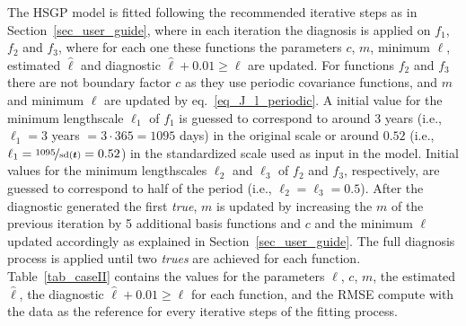 The HSGP model is fitted following the recommended iterative steps as in Section~\ref{sec_user_guide}, where in each iteration the diagnosis is applied on $f_1$, $f_2$ and $f_3$, where for each one these functions the parameters $c$, $m$, minimum $\ell$, estimated $\hat{\ell}$ and diagnostic $\hat{\ell} + 0.01 \geq \ell$ are updated. For functions $f_2$ and $f_3$ there are not boundary factor $c$ as they use periodic covariance functions, and $m$ and minimum $\ell$ are updated by eq.~\eqref{eq_J_l_periodic}. A initial value for the minimum lengthscale $\ell_1$ of $f_1$ is guessed to correspond to around 3 years (i.e., $\ell_1=3$ years $= 3\cdot 365=1095$ days) {\color{blue}in the original scale or around $0.52$ (i.e., $\ell_1=\nicefrac{1095}{\text{sd}(\bm{t})}=0.52$) in the standardized scale used as input in the model}. Initial values for the minimum lengthscales $\ell_2$ and $\ell_3$ of $f_2$ and $f_3$, respectively, are guessed to correspond to half of the period (i.e., $\ell_2=\ell_3=0.5$). After the diagnostic generated the first \textit{true}, $m$ is updated by increasing the $m$ of the previous iteration by 5 additional basis functions and $c$ and the minimum $\ell$ updated accordingly as explained in Section~\ref{sec_user_guide}. The full diagnosis process is applied until two \textit{trues} are achieved for each function. Table~\ref{tab_caseII} contains the values for the parameters $\ell$, $c$, $m$, the estimated $\hat{\ell}$, the diagnostic $\hat{\ell} + 0.01 \geq \ell$ for each function, and the RMSE compute with the data as the reference for every iterative steps of the fitting process.

